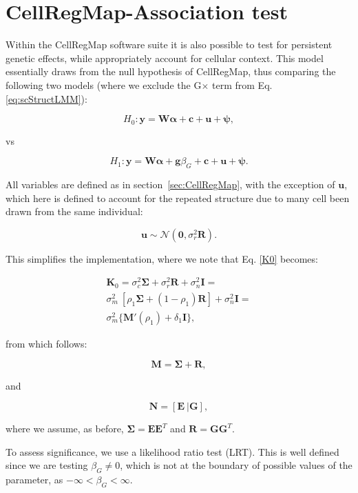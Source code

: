 \section{CellRegMap-Association test} \label{sec:assoc}

Within the CellRegMap software suite it is also possible to test for persistent genetic effects, while appropriately account for cellular context.
This model essentially draws from the null hypothesis of CellRegMap, thus comparing the following two models (where we exclude the G$\times$ term from Eq. \eqref{eq:scStructLMM}):

\begin{equation*}
    H_0: \mathbf{y} = \mathbf{W}\boldsymbol{\alpha} + \mathbf{c} + \mathbf{u} + \boldsymbol{\psi},
\end{equation*}

vs

\begin{equation*}
    H_1: \mathbf{y} = \mathbf{W}\boldsymbol{\alpha} + \mathbf{g}\beta_G + \mathbf{c} + \mathbf{u} + \boldsymbol{\psi}.
\end{equation*}

All variables are defined as in section~\ref{sec:CellRegMap}, with the exception of $\mathbf{u}$, which here is defined to account for the repeated structure due to many cell been drawn from the same individual:

\begin{equation*}
    \mathbf{u} \sim \mathcal{N}(\mathbf{0},\sigma_{r}^2 \mathbf{R}).
\end{equation*}

This simplifies the implementation, where we note that Eq. \eqref{K0} becomes:

\begin{equation}\label{K0}
\begin{split}
    \mathbf{K}_0 = \sigma_c^2 \boldsymbol{\Sigma} + \sigma_{r}^2 \mathbf{R} + \sigma_n^2 \mathbf{I} =\\
    \sigma_m^2 \ [\rho_1\boldsymbol{\Sigma} + (1-\rho_1) \mathbf{R} ] + \sigma_n^2 \mathbf{I} =\\ \sigma_m^2 \{ {\mathbf{M}'(\rho_1) + \delta_1 \mathbf{I}\}},
\end{split}
\end{equation}

from which follows:

\begin{equation}
    \mathbf{M} = \boldsymbol{\Sigma} + \mathbf{R},  
\end{equation}

and

\begin{equation}
    \mathbf{N} = [\mathbf{E} \ | \mathbf{G}],
\end{equation}

where we assume, as before, $\boldsymbol{\Sigma} = \mathbf{E}\mathbf{E}^T$ and $\mathbf{R} = \mathbf{G}\mathbf{G}^T$.

To assess significance, we use a likelihood ratio test (LRT).
This is well defined since we are testing $\beta_G \neq 0$, which is not at the boundary of possible values of the parameter, as $-\infty < \beta_G < \infty$.

